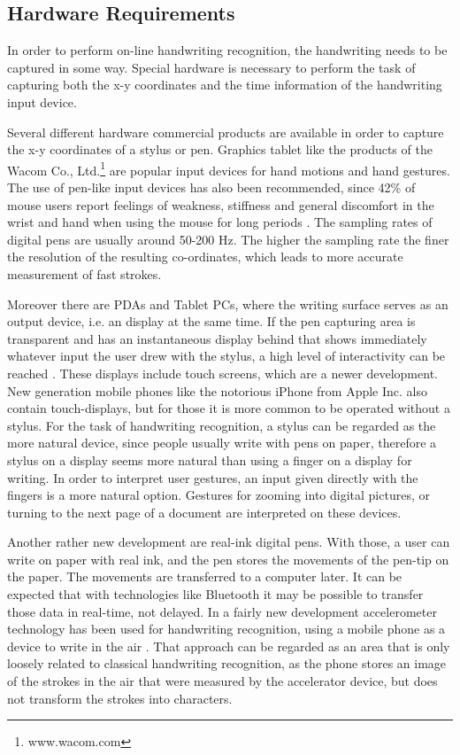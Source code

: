 \subsection{Hardware Requirements}
\label{sec:hardwarerequirements}

In order to perform on-line handwriting recognition, the handwriting needs to 
be captured in some way. Special hardware is necessary to perform the task of
capturing both the x-y coordinates and the time information of the handwriting
input device.

Several different hardware commercial products are available in order to
capture the x-y coordinates of a stylus or pen. Graphics tablet like the
products of the Wacom Co., Ltd.\footnote{www.wacom.com} are popular input
devices for hand motions and hand gestures. The use of pen-like input devices 
has also been recommended, since 42\% of mouse users report feelings of 
weakness, stiffness and general discomfort in the wrist and hand when 
using the mouse for long periods . 
The sampling rates of digital pens are usually around 50-200 Hz. The higher the
sampling rate the finer the resolution of the resulting co-ordinates,
which leads to more accurate measurement of fast strokes. 

Moreover there are PDAs and Tablet PCs, where the writing surface serves 
as an output device, i.e. an display at the same time.
If the pen capturing area is transparent and has an instantaneous display behind
that shows immediately whatever input the user drew with the stylus,
a high level of interactivity can be reached . 
These displays include touch screens, which are a newer development. 
New generation mobile phones like the notorious iPhone from Apple Inc. 
also contain touch-displays, but for those it is more common to be 
operated without a stylus. For the task of handwriting recognition, 
a stylus can be regarded as the more natural device, 
since people usually write with pens on paper,
therefore a stylus on a display seems more natural than using a 
finger on a display for writing. 
In order to interpret user gestures, an input given directly with the fingers
is a more natural option. Gestures for zooming into digital pictures, 
or turning to the next page of a document are interpreted on these devices.

Another rather new development are real-ink digital pens. With those, 
a user can write on paper with real ink, and the pen stores the 
movements of the pen-tip on the paper. The movements are transferred to a 
computer later. 
It can be expected that with technologies like Bluetooth it may be possible 
to transfer those data in real-time, not delayed.
In a fairly new development accelerometer technology has been used 
for handwriting recognition, using a mobile phone as a device to write 
in the air . That approach can be regarded as an area 
that is only loosely related to classical handwriting recognition, 
as the phone stores an image of the strokes in the air that were measured
by the accelerator device, but does not transform the strokes into characters.

